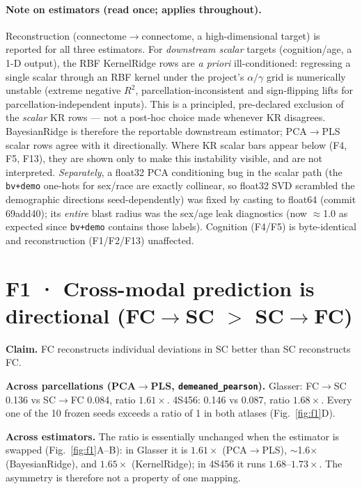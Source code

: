 \documentclass{article}
\newcommand{\fcsc}{FC$\rightarrow$SC}
\newcommand{\scfc}{SC$\rightarrow$FC}
\newcommand{\dpear}{\texttt{demeaned\_pearson}}
\newcommand{\bvdemo}{\texttt{bv+demo}}
\begin{document}
\paragraph{Note on estimators (read once; applies throughout).} Reconstruction
(connectome$\rightarrow$connectome, a high-dimensional target) is reported for all three
estimators. For \emph{downstream scalar} targets (cognition/age, a 1-D output), the RBF
KernelRidge rows are \emph{a priori} ill-conditioned: regressing a single scalar through an RBF
kernel under the project's $\alpha/\gamma$ grid is numerically unstable (extreme negative
$R^2$, parcellation-inconsistent and sign-flipping lifts for parcellation-independent inputs).
This is a principled, pre-declared exclusion of the \emph{scalar} KR rows --- not a
post-hoc choice made whenever KR disagrees. BayesianRidge is therefore the reportable
downstream estimator; PCA$\rightarrow$PLS scalar rows agree with it directionally. Where KR
scalar bars appear below (F4, F5, F13), they are shown only to make this instability visible,
and are not interpreted. \emph{Separately}, a float32 PCA conditioning bug in the scalar path
(the \bvdemo{} one-hots for sex/race are exactly collinear, so float32 SVD scrambled the
demographic directions seed-dependently) was fixed by casting to float64 (commit 69add40); its
\emph{entire} blast radius was the sex/age leak diagnostics (now $\approx$1.0 as expected since
\bvdemo{} contains those labels). Cognition (F4/F5) is byte-identical and reconstruction
(F1/F2/F13) unaffected.

\FloatBarrier
\section{F1 · Cross-modal prediction is directional (\fcsc{} $>$ \scfc{})}
\textbf{Claim.} FC reconstructs individual deviations in SC better than SC reconstructs FC.

\textbf{Across parcellations (PCA$\rightarrow$PLS, \dpear).} Glasser: \fcsc{} 0.136 vs \scfc{}
0.084, ratio $1.61\times$. 4S456: 0.146 vs 0.087, ratio $1.68\times$. Every one of the 10
frozen seeds exceeds a ratio of 1 in both atlases (Fig.~\ref{fig:f1}D).

\textbf{Across estimators.} The ratio is essentially unchanged when the estimator is swapped
(Fig.~\ref{fig:f1}A--B): in Glasser it is $1.61\times$ (PCA$\rightarrow$PLS), $\sim$1.6$\times$
(BayesianRidge), and $1.65\times$ (KernelRidge); in 4S456 it runs $1.68$--$1.73\times$. The
asymmetry is therefore not a property of one mapping.
\end{document}
